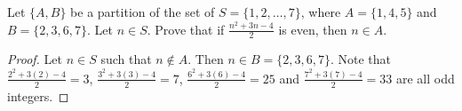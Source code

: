 \documentclass[12pt]{article}
\newenvironment{problem}[2][Problem]{\begin{trivlist}
		\item[\hskip \labelsep {\bfseries #1}\hskip \labelsep {\bfseries #2.}]}{\end{trivlist}}
\begin{document}
	\begin{problem}{25} 
		Let $\{A,B\}$ be a partition of the set of $S=\{1,2,\ldots,7\}$, where $A=\{1,4,5\}$ and $B=\{2,3,6,7\}$. Let $n\in S$. Prove that if $\frac{n^{2}+3n-4}{2}$ is even, then $n\in A$.
		\begin{proof}
			Let $n\in S$ such that $n\notin A$. Then $n \in B=\{2,3,6,7\}$. Note that $\frac{2^{2}+3(2)-4}{2}=3$, $\frac{3^{2}+3(3)-4}{2}=7$, $\frac{6^{2}+3(6)-4}{2}=25$ and $\frac{7^{2}+3(7)-4}{2}=33$ are all odd integers.
		\end{proof}
	\end{problem}
\end{document}
